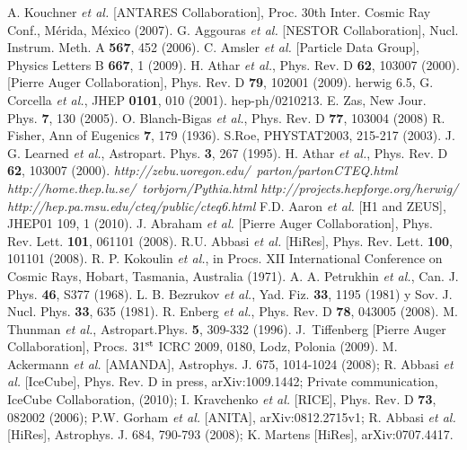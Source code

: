 \begin{thebibliography}{1}
 A. Kouchner {\it et al.} [ANTARES Collaboration], Proc. 30th Inter. Cosmic Ray Conf., Mérida, México (2007).
 G. Aggouras {\it et al.} [NESTOR Collaboration], Nucl. Instrum. Meth. A \textbf{567}, 452 (2006).
 C. Amsler {\it et al.} [Particle Data Group], Physics Letters B {\bf 667}, 1 (2009).
 H. Athar {\it et al.}, Phys. Rev. D \textbf{62}, 103007 (2000).
 [Pierre Auger Collaboration], Phys. Rev. D \textbf{79}, 102001 (2009).
 {\sc herwig 6.5}, G. Corcella {\it et al.}, JHEP \textbf{0101}, 010 (2001). hep-ph/0210213.
 E. Zas, New Jour. Phys. \textbf{7}, 130 (2005).
 O. Blanch-Bigas {\it et al.}, Phys. Rev. D \textbf{77}, 103004 (2008)
 R. Fisher, Ann of Eugenics {\bf7}, 179 (1936).
 S.Roe, PHYSTAT2003, 215-217 (2003).
 J. G. Learned {\it et al.}, Astropart. Phys. \textbf{3}, 267 (1995). H. Athar {\it et al.}, Phys. Rev. D \textbf{62}, 103007 (2000).
 \emph{http://zebu.uoregon.edu/~parton/partonCTEQ.html}
 \emph{http://home.thep.lu.se/~torbjorn/Pythia.html}
 \emph{http://projects.hepforge.org/herwig/}
 \emph{http://hep.pa.msu.edu/cteq/public/cteq6.html}
 F.D. Aaron {\it et al.} [H1 and ZEUS], JHEP01 109, 1 (2010).
 J. Abraham {\it et al.} [Pierre Auger Collaboration], Phys. Rev. Lett. \textbf{101}, 061101 (2008). R.U. Abbasi {\it et al.} [HiRes], Phys. Rev. Lett. \textbf{100}, 101101 (2008).
 R. P. Kokoulin {\sl et al.}, in Procs. XII International Conference on Cosmic Rays, Hobart, Tasmania, Australia (1971).
 A. A. Petrukhin {\sl et al.}, Can. J. Phys. \textbf{46}, S377 (1968).
 L. B. Bezrukov {\sl et al.}, Yad. Fiz. \textbf{33}, 1195 (1981) y Sov. J. Nucl. Phys. \textbf{33}, 635 (1981).
 R. Enberg {\sl et al.}, Phys. Rev. D \textbf{78}, 043005 (2008).
 M. Thunman {\sl et al.}, Astropart.Phys. \textbf{5}, 309-332 (1996).
 J.~Tiffenberg [Pierre Auger Collaboration], Procs. $31^{\rm st}$ ICRC 2009, 0180, Lodz, Polonia (2009).
 M. Ackermann {\it et al.} [AMANDA], Astrophys. J. 675, 1014-1024 (2008); R. Abbasi {\it et al.} [IceCube], Phys. Rev. D in press, arXiv:1009.1442; Private communication, IceCube Collaboration, (2010); I. Kravchenko {\it et al.} [RICE], Phys. Rev. D {\bf 73}, 082002 (2006); P.W. Gorham {\it et al.} [ANITA], arXiv:0812.2715v1; R. Abbasi {\it et al.} [HiRes], Astrophys. J. 684, 790-793 (2008); K. Martens [HiRes], arXiv:0707.4417.

\end{thebibliography}

